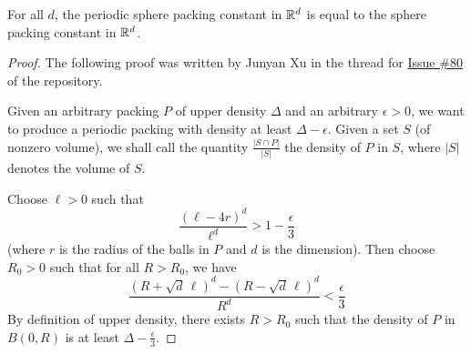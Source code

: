 \begin{theorem}\label{thm:periodic-packing-optimal}\leanok
    For all $d$, the periodic sphere packing constant in $\mathbb{R}^d$ is equal to the sphere packing constant in $\mathbb{R}^d$.
\end{theorem}
\begin{proof}
  The following proof was written by Junyan Xu in the thread for \href{https://github.com/thefundamentaltheor3m/Sphere-Packing-Lean/issues/80}{Issue \#80} of the repository.

  Given an arbitrary packing $P$ of upper density $\Delta$ and an arbitrary $\epsilon > 0$, we want to produce a periodic packing with density at least $\Delta - \epsilon$. Given a set $S$ (of nonzero volume), we shall call the quantity $\frac{\left| S \cap P \right|}{\left| S \right|}$ the density of $P$ in $S$, where $\left| S \right|$ denotes the volume of $S$.

  Choose $\ell > 0$ such that
  \[
    \frac{(\ell - 4r)^d}{\ell^d} > 1 - \frac{\epsilon}{3}
  \]
  (where $r$ is the radius of the balls in $P$ and $d$ is the dimension). Then choose $R_0 > 0$ such that for all $R > R_0$, we have
  \[
    \frac{\left( R + \sqrt{d}\,\ell \right)^d - \left( R - \sqrt{d}\,\ell \right)^d}{R^d} < \frac{\epsilon}{3}
  \]
  By definition of upper density, there exists $R > R_0$ such that the density of $P$ in $B(0,R)$ is at least $\Delta - \frac{\epsilon}{3}$.


\end{proof}
